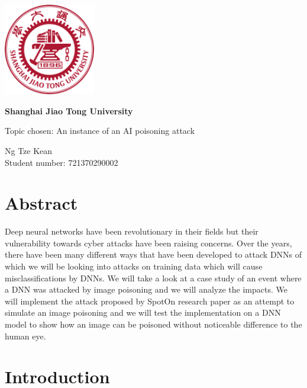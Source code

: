 \documentclass{article}
\begin{document}
\begin{titlepage}
      \begin{center}
            \vfill

            \includegraphics[width=4cm]{sjtu.png}

            \vspace{1cm}

            \textbf{\huge Shanghai Jiao Tong University}

            \vspace{0.5cm}

            {\large Topic chosen: An instance of an AI poisoning attack}

            \vspace{1.5cm}

            Ng Tze Kean\\Student number: 721370290002

      \end{center}
\end{titlepage}

\tableofcontents


\section{Abstract}

Deep neural networks have been revolutionary in their fields but their
vulnerability towards cyber attacks have been raising concerns. Over the years,
there have been many different ways that have been developed to attack DNNs of
which we will be looking into attacks on training data which will cause
misclassifications by DNNs. We will take a look at a case study of an event
where a DNN was attacked by image poisoning and we will analyze the impacts. We
will implement the attack proposed by SpotOn research paper as an attempt to
simulate an image poisoning and we will test the implementation on a DNN model
to show how an image can be poisoned without noticeable difference to the human
eye.

\section{Introduction}
\end{document}
